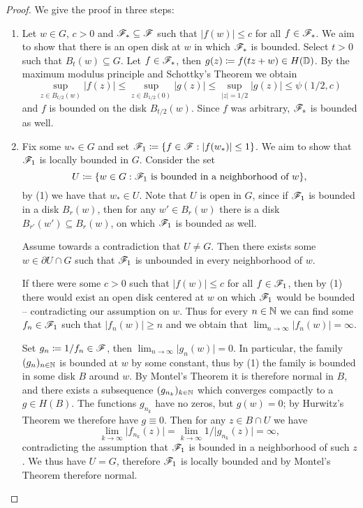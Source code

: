 \begin{proof}
    We give the proof in three steps:
    \begin{enumerate}
        \item Let $w \in G$, $c > 0$ and $\mathscr{F}_* \subseteq \mathscr{F}$ such that $\vert f(w) \vert \leq c$ for all $f \in \mathscr{F}_*$. We aim to show that there is an open disk at $w$ in which $\mathscr{F}_*$ is bounded. Select $t > 0$ such that $B_t(w) \subseteq G$. Let $f \in \mathscr{F}_*$, then $g(z) \coloneqq f(tz + w) \in H(\mathbb{D})$. By the maximum modulus principle and Schottky's Theorem we obtain
        $$ \sup_{z \in B_{t/2}(w)} \vert f(z) \vert \leq \sup_{z \in B_{1/2}(0)} \vert g(z) \vert \leq \sup_{\vert z \vert = 1/2} \vert g(z) \vert \leq \psi(1/2, c) $$
        and $f$ is bounded on the disk $B_{t/2}(w)$. Since $f$ was arbitrary, $\mathscr{F}_*$ is bounded as well.

        \item Fix some $w_* \in G$ and set $\mathscr{F}_1 \coloneqq \{ f \in \mathscr{F} : \vert f(w_*) \vert \leq 1 \}$. We aim to show that $\mathscr{F}_1$ is locally bounded in $G$. Consider the set
        $$ U \coloneqq \{ w \in G : \mathscr{F}_1 \textrm{ is bounded in a neighborhood of } w \}, $$
        by (1) we have that $w_* \in U$. Note that $U$ is open in $G$, since if $\mathscr{F}_1$ is bounded in a disk $B_r(w)$, then for any $w' \in B_r(w)$ there is a disk $B_{r'}(w') \subseteq B_r(w)$, on which $\mathscr{F}_1$ is bounded as well.
        
        Assume towards a contradiction that $U \neq G$. Then there exists some $w \in \partial U \cap G$ such that $\mathscr{F}_1$ is unbounded in every neighborhood of $w$.

        If there were some $c > 0$ such that $\vert f(w) \vert \leq c$ for all $f \in \mathscr{F}_1$, then by (1) there would exist an open disk centered at $w$ on which $\mathscr{F}_1$ would be bounded -- contradicting our assumption on $w$. Thus for every $n \in \mathbb{N}$ we can find some $f_n \in \mathscr{F}_1$ such that $\vert f_n(w) \vert \geq n$ and we obtain that $\lim_{n \to \infty} \vert f_n(w) \vert = \infty$.
        
        Set $g_n \coloneqq 1 / f_n \in \mathscr{F}$, then $\lim_{n \to \infty} \vert g_n(w) \vert = 0$. In particular, the family $(g_n)_{n \in \mathbb{N}}$ is bounded at $w$ by some constant, thus by (1) the family is bounded in some disk $B$ around $w$. By Montel's Theorem it is therefore normal in $B$, and there exists a subsequence $(g_{n_k})_{k \in \mathbb{N}}$ which converges compactly to a $g \in H(B)$. The functions $g_{n_k}$ have no zeros, but $g(w) = 0$; by Hurwitz's Theorem we therefore have $g \equiv 0$. Then for any $z \in B \cap U$ we have
        $$ \lim_{k \to \infty} \vert f_{n_k}(z) \vert = \lim_{k \to \infty} 1 / \vert g_{n_k}(z) \vert = \infty, $$
        contradicting the assumption that $\mathscr{F}_1$ is bounded in a neighborhood of such $z$. We thus have $U = G$, therefore $\mathscr{F}_1$ is locally bounded and by Montel's Theorem therefore normal.


\end{enumerate}
\end{proof}
